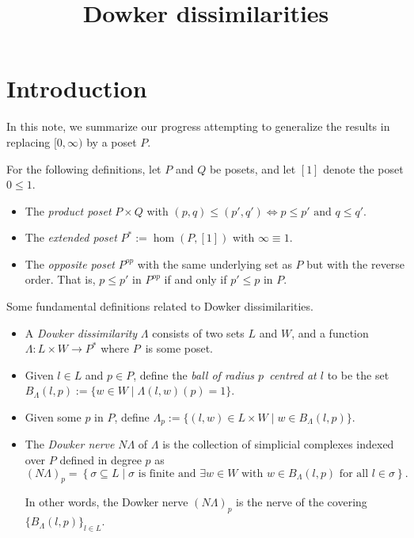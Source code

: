 
\title{Dowker dissimilarities}


\maketitle

\section{Introduction}

In this note, we summarize our progress attempting to generalize the results in \autocite{blaser2019sparse} replacing $[0,\infty)$ by a poset $P$.

\begin{defn}
	For the following definitions, let $P$ and $Q$ be posets, and let $[1]$ denote the poset $0\leq 1$.
	\begin{itemize}
		\item The \textit{product poset} $P\times Q$ with $(p,q)\leq(p',q')\iff p\leq p'\text{ and }q\leq q'$.
		
		\item The \textit{extended poset} $P^*:=\hom(P,[1])$ with $\infty \equiv 1$.
		
		\item The \textit{opposite poset} $P^{op}$ with the same underlying set as $P$ but with the reverse order. That is, $p\leq p'$ in $P^{op}$ if and only if $p'\leq p$ in $P$.
	\end{itemize}
\end{defn} 

\begin{defn}
	Some fundamental definitions related to Dowker dissimilarities.
	\begin{itemize}
		\item A \textit{Dowker dissimilarity} $\Lambda$ consists of two sets $L$ and $W$, and a function $\Lambda\colon L\times W\to P^*$ where $P$ is some poset.
		
		\item Given $l\in L$ and $p\in P$, define the \textit{ball of radius $p$ centred at $l$} to be the set $B_\Lambda(l,p):=\{w\in W\mid\Lambda(l,w)(p)=1\}$. 
		
		\item Given some $p$ in $P$, define $\Lambda_p:=\{(l,w)\in L\times W\mid w\in B_\Lambda(l,p)\}$.
		
		\item The \textit{Dowker nerve} $N\Lambda$ of $\Lambda$ is the collection of simplicial complexes indexed over $P$ defined in degree $p$ as 
		$$
		(N\Lambda)_{p} = \left\{\sigma\subseteq L\mid\sigma\text{ is finite and } \exists w\in W \text{ with } w\in B_\Lambda(l,p)\text{ for all }l\in\sigma \right\}.
		$$
		
		In other words, the Dowker nerve $(N\Lambda)_p$ is the nerve of the covering $\{B_\Lambda(l,p)\}_{l\in L}$.
	\end{itemize}
\end{defn} 

